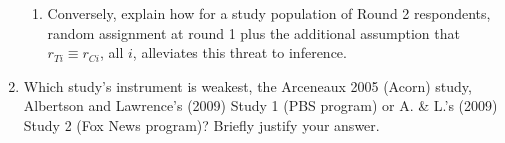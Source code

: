 \documentclass{article}
\begin{document}
\begin{enumerate}
\begin{enumerate}
  \item Conversely, explain how for a study population of Round 2 respondents,
       random assignment at round 1 plus the additional assumption that $r_{Ti}
       \equiv r_{Ci}$, all $i$, alleviates this threat to inference.
  \end{enumerate}
\item Which study's instrument is weakest, the Arceneaux 2005 (Acorn) study,
    Albertson and Lawrence's (2009) Study 1 (PBS program) or A. \& L.'s (2009)
    Study 2 (Fox News program)? Briefly justify your answer.
\end{enumerate}
\end{document}
